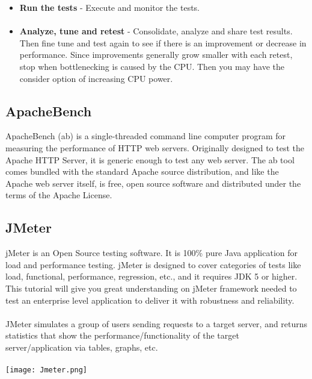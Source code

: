 \documentclass[../thesis.tex]{subfiles}
\begin{document}
\begin{itemize}
\paragraph{}
\item \textbf{Run the tests} - Execute and monitor the tests.
\paragraph{}
\item \textbf{Analyze, tune and retest} - Consolidate, analyze and share test results. Then fine tune and test again to see if there is an improvement or decrease in performance. Since improvements generally grow smaller with each retest, stop when bottlenecking is caused by the CPU. Then you may have the consider option of increasing CPU power.
\end{itemize}
\subsection{ApacheBench}
ApacheBench (ab) is a single-threaded command line computer program for measuring the performance of HTTP web servers. Originally designed to test the Apache HTTP Server, it is generic enough to test any web server.
The ab tool comes bundled with the standard Apache source distribution, and like the Apache web server itself, is free, open source software and distributed under the terms of the Apache License. \cite{ab}

\subsection{JMeter}
jMeter is an Open Source testing software. It is 100\% pure Java application for load and performance testing. jMeter is designed to cover categories of tests like load, functional, performance, regression, etc., and it requires JDK 5 or higher. This tutorial will give you great understanding on jMeter framework needed to test an enterprise level application to deliver it with robustness and reliability. \cite{jmeter}
\paragraph{}
JMeter simulates a group of users sending requests to a target server, and returns statistics that show the performance/functionality of the target server/application via tables, graphs, etc.
\paragraph{}
\texttt{[image: Jmeter.png]} 
\end{document}
